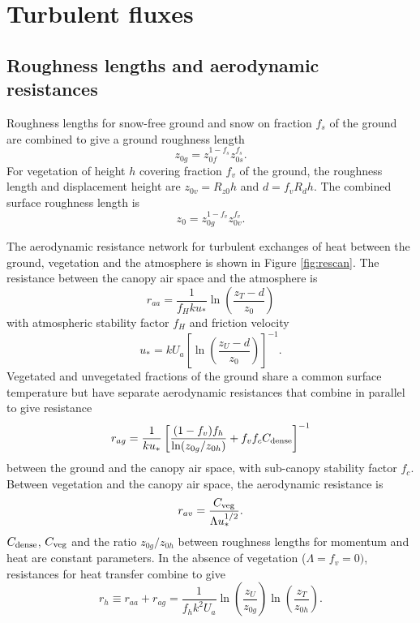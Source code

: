 \documentclass{article}
\begin{document}
\section{Turbulent fluxes}

\subsection{Roughness lengths and aerodynamic resistances}

Roughness lengths for snow-free ground and snow on fraction $f_s$ of the ground are combined to give a ground roughness length
\begin{equation}
z_{0g} =  z_{0f}^{1-f_s} z_{0s}^{f_s}.
\end{equation}
For vegetation of height $h$ covering fraction $f_v$ of the ground, the roughness length and displacement height are $z_{0v} = R_{z0}h$ and $d = f_vR_dh$. The combined surface roughness length is
\begin{equation}
z_0 = z_{0g}^{1-f_v} z_{0v}^{f_v}.
\end{equation}

The aerodynamic resistance network for turbulent exchanges of heat between the ground, vegetation and the atmosphere is shown in Figure \ref{fig:rescan}. The resistance between the canopy air space and the atmosphere is
\begin{equation}
r_{aa} = \frac{1}{f_H k u_*}\ln\left(\frac{z_T-d}{z_0}\right)
\label{eq:raa} 
\end{equation}
with atmospheric stability factor $f_H$ and friction velocity
\begin{equation}
u_* = kU_a\left[\ln\left(\frac{z_U-d}{z_0}\right)\right]^{-1}.
\end{equation}
Vegetated and unvegetated fractions of the ground share a common surface temperature but have separate aerodynamic resistances that combine in parallel to give resistance
\begin{equation}
r_{ag} = \frac{1}{ku_*}\left[\frac{(1-f_v)f_h}{\ln(z_{0g}/z_{0h})} + 
                             f_vf_cC_{\rm dense}\right]^{-1}
\label{eq:rag} 
\end{equation}
between the ground and the canopy air space, with sub-canopy stability factor $f_c$. Between vegetation and the canopy air space, the aerodynamic resistance is
\begin{equation}
r_{av} = \frac{C_{\rm veg}}{\Lambda u_*^{1/2}}.
\end{equation}
$C_{\rm dense}$, $C_{\rm veg}$ and the ratio $z_{0g}/z_{0h}$ between roughness lengths for momentum and heat are constant parameters. In the absence of vegetation ($\Lambda=f_v=0)$, resistances for heat transfer combine to give
\begin{equation}
r_h \equiv r_{aa} + r_{ag} = \frac{1}{f_hk^2U_a}\ln\left(\frac{z_U}{z_{0g}}\right)
                                                \ln\left(\frac{z_T}{z_{0h}}\right).
\label{eq:rh}
\end{equation}
\end{document}
